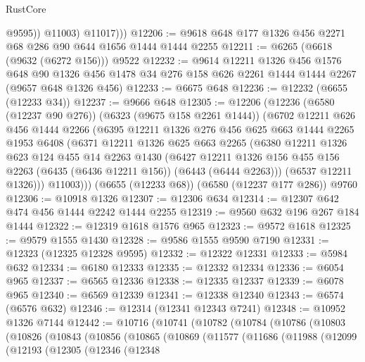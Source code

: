 \begin{lexlean}{RustCore}
\begin{coremodule}
                @9595))
            @11003)
          @11017)))
@12206 := @9618 @648 @177 @1326 @456 @2271 @68 @286 @90 @644 @1656 @1444 @1444 @2255
@12211 := @6265 (@6618 (@9632 (@6272 @156))) @9522
@12232 := @9614
    @12211
    @1326
    @456
    @1576
    @648
    @90
    @1326
    @456
    @1478
    @34
    @276
    @158
    @626
    @2261
    @1444
    @1444
    @2267
    (@9657 @648 @1326 @456)
@12233 := @6675 @648
@12236 := @12232 (@6655 (@12233 @34))
@12237 := @9666 @648
@12305 := @12206
    (@12236
      (@6580 (@12237 @90 @276))
      (@6323 (@9675 @158 @2261 @1444))
      (@6702
        @12211
        @626
        @456
        @1444
        @2266
        (@6395
          @12211
          @1326
          @276
          @456
          @625
          @663
          @1444
          @2265
          @1953
          @6408
          (@6371
            @12211
            @1326
            @625
            @663
            @2265
            (@6380
              @12211
              @1326
              @623
              @124
              @455
              @14
              @2263
              @1430
              (@6427
                @12211
                @1326
                @156
                @455
                @156
                @2263
                (@6435 (@6436 @12211 @156))
                (@6443 (@6444 @2263)))
              (@6537 @12211 @1326)))
          @11003)))
    (@6655 (@12233 @68))
    (@6580 (@12237 @177 @286))
    @9760
@12306 := @10918 @1326
@12307 := @12306 @634
@12314 := @12307 @642 @474 @456 @1444 @2242 @1444 @2255
@12319 := @9560 @632 @196 @267 @184 @1444
@12322 := @12319 @1618 @1576 @965
@12323 := @9572 @1618
@12325 := @9579 @1555 @1430
@12328 := @9586 @1555 @9590 @7190
@12331 := @12323 (@12325 @12328 @9595)
@12332 := @12322 @12331
@12333 := @5984 @632
@12334 := @6180 @12333
@12335 := @12332 @12334
@12336 := @6054 @965
@12337 := @6565 @12336
@12338 := @12335 @12337
@12339 := @6078 @965
@12340 := @6569 @12339
@12341 := @12338 @12340
@12343 := @6574 (@6576 @632)
@12346 := @12314 (@12341 @12343 @7241)
@12348 := @10952 @1326 @7144
@12442 := @10716
    (@10741
      (@10782
        (@10784
          (@10786
            (@10803
              (@10826
                (@10843
                  (@10856
                    (@10865
                      (@10869
                        (@11577
                          (@11686
                            (@11988
                              (@12099
                                (@12193
                                  (@12305
                                    (@12346
                                      (@12348

\end{coremodule}
\end{lexlean}
